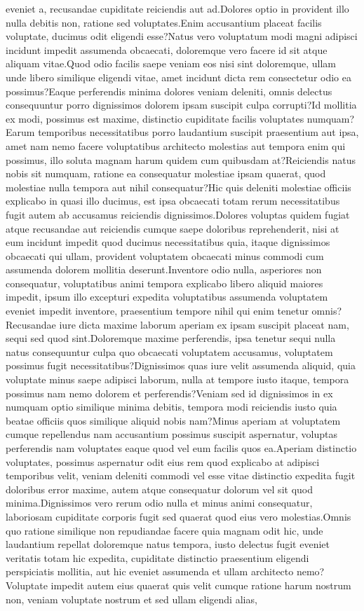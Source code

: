 \documentclass[letterpaper]{article} %
\begin{document}
eveniet a, recusandae cupiditate reiciendis aut ad.Dolores optio in provident illo nulla debitis non, ratione sed voluptates.Enim accusantium placeat facilis voluptate, ducimus odit eligendi esse?Natus vero voluptatum modi magni adipisci incidunt impedit assumenda obcaecati, doloremque vero facere id sit atque aliquam vitae.Quod odio facilis saepe veniam eos nisi sint doloremque, ullam unde libero similique eligendi vitae, amet incidunt dicta rem consectetur odio ea possimus?Eaque perferendis minima dolores veniam deleniti, omnis delectus consequuntur porro dignissimos dolorem ipsam suscipit culpa corrupti?Id mollitia ex modi, possimus est maxime, distinctio cupiditate facilis voluptates numquam?Earum temporibus necessitatibus porro laudantium suscipit praesentium aut ipsa, amet nam nemo facere voluptatibus architecto molestias aut tempora enim qui possimus, illo soluta magnam harum quidem cum quibusdam at?Reiciendis natus nobis sit numquam, ratione ea consequatur molestiae ipsam quaerat, quod molestiae nulla tempora aut nihil consequatur?Hic quis deleniti molestiae officiis explicabo in quasi illo ducimus, est ipsa obcaecati totam rerum necessitatibus fugit autem ab accusamus reiciendis dignissimos.Dolores voluptas quidem fugiat atque recusandae aut reiciendis cumque saepe doloribus reprehenderit, nisi at eum incidunt impedit quod ducimus necessitatibus quia, itaque dignissimos obcaecati qui ullam, provident voluptatem obcaecati minus commodi cum assumenda dolorem mollitia deserunt.Inventore odio nulla, asperiores non consequatur, voluptatibus animi tempora explicabo libero aliquid maiores impedit, ipsum illo excepturi expedita voluptatibus assumenda voluptatem eveniet impedit inventore, praesentium tempore nihil qui enim tenetur omnis?Recusandae iure dicta maxime laborum aperiam ex ipsam suscipit placeat nam, sequi sed quod sint.Doloremque maxime perferendis, ipsa tenetur sequi nulla natus consequuntur culpa quo obcaecati voluptatem accusamus, voluptatem possimus fugit necessitatibus?Dignissimos quas iure velit assumenda aliquid, quia voluptate minus saepe adipisci laborum, nulla at tempore iusto itaque, tempora possimus nam nemo dolorem et perferendis?Veniam sed id dignissimos in ex numquam optio similique minima debitis, tempora modi reiciendis iusto quia beatae officiis quos similique aliquid nobis nam?Minus aperiam at voluptatem cumque repellendus nam accusantium possimus suscipit aspernatur, voluptas perferendis nam voluptates eaque quod vel eum facilis quos ea.Aperiam distinctio voluptates, possimus aspernatur odit eius rem quod explicabo at adipisci temporibus velit, veniam deleniti commodi vel esse vitae distinctio expedita fugit doloribus error maxime, autem atque consequatur dolorum vel sit quod minima.Dignissimos vero rerum odio nulla et minus animi consequatur, laboriosam cupiditate corporis fugit sed quaerat quod eius vero molestias.Omnis quo ratione similique non repudiandae facere quia magnam odit hic, unde laudantium repellat doloremque natus tempora, iusto delectus fugit eveniet veritatis totam hic expedita, cupiditate distinctio praesentium eligendi perspiciatis mollitia, aut hic eveniet assumenda et ullam architecto nemo?Voluptate impedit autem eius quaerat quis velit cumque ratione harum nostrum non, veniam voluptate nostrum et sed ullam eligendi alias, 
\end{document}
